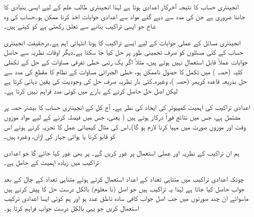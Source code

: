 انجینئری حساب کا نتیجہ آخرکار اعدادی ہوتا ہے لہٰذا انجینئری طالب علم  کے لیے ایسی بنیادی  کا جاننا ضروری ہے جن کی مدد سے دیے گئے مواد سے اعدادی جوابات اخذ کرنا ممکن ہو۔حساب کی وہ شاخ جو  ایسی تراکیب بنانے سے تعلق رکھتی ہے کو  کہتے ہیں۔ 

انجینئری مسائل کے عملی جوابات کے لیے ایسے تراکیب کا ہونا انتہائی اہم ہے۔درحقیقت انجینئری حساب کے کئی مسئلوں کو صرف تخمینی طور پر حل کیا جا سکتا ہے۔دیگر اوقات نظریہ سے حاصل جوابات عملاً قابل استعمال نہیں ہوتے ہیں، مثلاً اگر یک رتبی خطی تفرقی مساوات کے حل کے تکملی کلیہ (حصہ ) میں تکمل کا حصول ناممکن ہو، خطی الجبرائی مساوات کے نظام کا مقطع کی مدد سے حل بذریعہ قاعدہ کریمر (حصہ )، وغیرہ۔کئی بار نظریہ صرف حل کی وجودیت کی یقین دہانی کرتا ہے لیکن اصل حل حاصل کرنے کے بارے میں کوئی مدد فراہم نہیں کرتا ہے۔

اعدادی تراکیب کی اہمیت کمپیوٹر کی ایجاد کی نظر ہے۔ آج کل کے انجینئری حساب کا بیشتر حصہ  پر مشتمل ہے، جس میں نتائج فوراً درکار ہوتے ہیں ( یعنی، جس میں فیصلہ کرنے کے لیے مواد موزوں وقت اور موزوں صورت میں مہیا کرنا  لازم ہو گا)۔اس کی مثال کیمیائی عمل کا تجزیہ کرتے ہوئے اس کو قابو کرنا یا ہوائی جہاز کی اڑان، وغیرہ ہیں۔  

ہم ان تراکیب کے نظریہ اور عملی استعمال پر غور کریں گے۔ پر بھی غور کیا جائے گا جو اعدادی تراکیب میں زیادہ اہمیت کے حامل ہے۔     

چونکہ اعدادی تراکیب میں متناہی تعداد کے اعداد استعمال کرتے ہوئے متناہی تعداد کے چال کے بعد جواب حاصل کیا جاتا ہے لہٰذا  یہ تراکیب   ہیں جو اصل (نا معلوم) بالکل درست حل کا  پیش کرتے ہیں ماسوائے ان چند صورتوں میں جب اصل جواب کافی سادہ ناطق عدد ہو اور ہم کوئی ایسا اعدادی ترکیب استعمال کریں جو یہی بالکل درست جواب فراہم کرتا ہو۔

